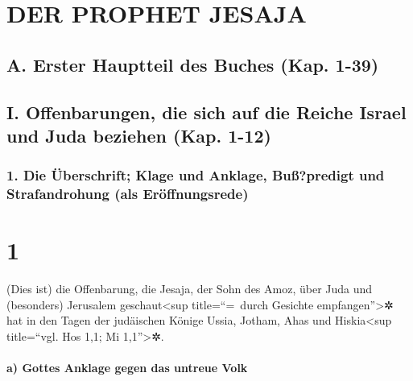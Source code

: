 \hypertarget{der-prophet-jesaja}{%
\section{DER PROPHET JESAJA}\label{der-prophet-jesaja}}

\hypertarget{a.-erster-hauptteil-des-buches-kap.-1-39}{%
\subsection{A. Erster Hauptteil des Buches (Kap.
1-39)}\label{a.-erster-hauptteil-des-buches-kap.-1-39}}

\hypertarget{i.-offenbarungen-die-sich-auf-die-reiche-israel-und-juda-beziehen-kap.-1-12}{%
\subsection{I. Offenbarungen, die sich auf die Reiche Israel und Juda
beziehen (Kap.
1-12)}\label{i.-offenbarungen-die-sich-auf-die-reiche-israel-und-juda-beziehen-kap.-1-12}}

\hypertarget{die-uxfcberschrift-klage-und-anklage-buuxdfpredigt-und-strafandrohung-als-eruxf6ffnungsrede}{%
\subsubsection{1. Die Überschrift; Klage und Anklage, Buß?predigt und
Strafandrohung (als
Eröffnungsrede)}\label{die-uxfcberschrift-klage-und-anklage-buuxdfpredigt-und-strafandrohung-als-eruxf6ffnungsrede}}

\hypertarget{section}{%
\section{1}\label{section}}

(Dies ist) die Offenbarung, die Jesaja, der Sohn des Amoz,
über Juda und (besonders) Jerusalem geschaut\textless sup
title=``=~durch Gesichte empfangen''\textgreater✲ hat in den Tagen der
judäischen Könige Ussia, Jotham, Ahas und Hiskia\textless sup
title=``vgl. Hos 1,1; Mi 1,1''\textgreater✲.

\hypertarget{a-gottes-anklage-gegen-das-untreue-volk}{%
\paragraph{a) Gottes Anklage gegen das untreue
Volk}\label{a-gottes-anklage-gegen-das-untreue-volk}}

